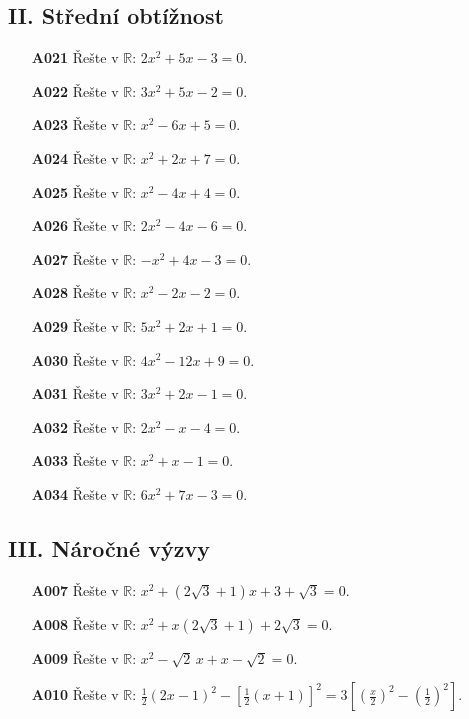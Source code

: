 \documentclass[11pt,a4paper]{article}
\begin{document}
\subsection*{II. Střední obtížnost}
\begin{enumerate}[label={},itemsep=5pt]
\item[\textbf{A021}] Řešte v $\mathbb R$: $2x^{2} + 5x - 3=0$.
\item[\textbf{A022}] Řešte v $\mathbb R$: $3x^{2} + 5x - 2=0$.
\item[\textbf{A023}] Řešte v $\mathbb R$: $x^{2} - 6x + 5=0$.
\item[\textbf{A024}] Řešte v $\mathbb R$: $x^{2} + 2x + 7=0$.
\item[\textbf{A025}] Řešte v $\mathbb R$: $x^{2} - 4x + 4=0$.
\item[\textbf{A026}] Řešte v $\mathbb R$: $2x^{2} - 4x - 6=0$.
\item[\textbf{A027}] Řešte v $\mathbb R$: $- x^{2} + 4x - 3=0$.
\item[\textbf{A028}] Řešte v $\mathbb R$: $x^{2} - 2x - 2=0$.
\item[\textbf{A029}] Řešte v $\mathbb R$: $5x^{2} + 2x + 1=0$.
\item[\textbf{A030}] Řešte v $\mathbb R$: $4x^{2} - 12x + 9=0$.
\item[\textbf{A031}] Řešte v $\mathbb R$: $3x^{2} + 2x - 1=0$.
\item[\textbf{A032}] Řešte v $\mathbb R$: $2x^{2} - x - 4=0$.
\item[\textbf{A033}] Řešte v $\mathbb R$: $x^{2} + x - 1=0$.
\item[\textbf{A034}] Řešte v $\mathbb R$: $6x^{2} + 7x - 3=0$.
\end{enumerate}
\subsection*{III. Náročné výzvy}
\begin{enumerate}[label={},itemsep=5pt]
\item[\textbf{A007}] Řešte v $\mathbb R$: $x^2+(2\sqrt3+1)x+3+\sqrt3=0$. 
\item[\textbf{A008}] Řešte v $\mathbb R$: $x^2+x(2\sqrt3+1)+2\sqrt3=0$. 
\item[\textbf{A009}] Řešte v $\mathbb R$: $x^2-\sqrt2\,x+x-\sqrt2=0$. 
\item[\textbf{A010}] Řešte v $\mathbb R$: $\frac12(2x-1)^2-\left[\frac12(x+1)\right]^2=3\left[\left(\frac x2\right)^2-\left(\frac12\right)^2\right]$. 
\end{enumerate}
\end{document}
